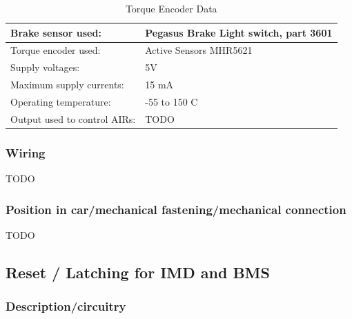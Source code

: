\documentclass{article}
\begin{document}
	\begin{table}[H]
	    \centering
	    \begin{tabular}{|l|l|}
	    \hline
	    Brake sensor used: & Pegasus Brake Light switch, part 3601 \\ \hline
	    Torque encoder used: &  Active Sensors MHR5621\\ \hline
	    Supply voltages: & 5V \\ \hline
	    Maximum supply currents: & 15 mA\\ \hline
	    Operating temperature: & -55 to 150 \degree C \\ \hline
	    Output used to control AIRs: & TODO \\ \hline
	    \end{tabular}
	    \caption{Torque Encoder Data}
	    \label{TorqueEncoder1}
	\end{table}

\subsubsection{Wiring}
TODO

\subsubsection{Position in car/mechanical fastening/mechanical connection}
TODO











\subsection{Reset / Latching for IMD and BMS}
\subsubsection{Description/circuitry}
\end{document}
